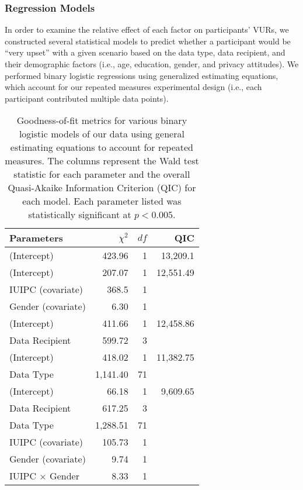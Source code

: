 
\subsubsection{Regression Models} 
\label{sec:regression}
In order to examine the relative effect of each factor on participants' VURs, we constructed several statistical models to predict whether a participant would be ``very upset'' with a given scenario based on the data type, data recipient, and their demographic factors (i.e., age, education, gender, and privacy attitudes). We performed binary logistic regressions using generalized estimating equations, which account for our repeated measures experimental design (i.e., each participant contributed multiple data points).

\begin{table}[t]
\centering
\begin{tabular}{|l| r| r| r|}
\hline
Parameters & $\chi^2$ & $df$ & QIC\\
\hline
\hline
(Intercept) & 423.96 & 1 & 13,209.1\\
\hline
(Intercept) & 207.07 & 1 & 12,551.49\\
IUIPC (covariate) & 368.5 & 1 & \\
Gender (covariate) & 6.30 & 1 & \\
\hline
(Intercept) & 411.66 & 1 &12,458.86\\
Data Recipient & 599.72 & 3 & \\
\hline
(Intercept) & 418.02 & 1 & 11,382.75\\
Data Type & 1,141.40 & 71 & \\
\hline
(Intercept) & 66.18 & 1 & 9,609.65 \\
Data Recipient & 617.25 & 3 & \\
Data Type & 1,288.51 & 71 & \\
IUIPC (covariate) & 105.73 & 1 & \\
Gender (covariate) & 9.74 & 1 & \\
IUIPC $\times$ Gender & 8.33 & 1 &\\
\hline
\end{tabular}
\caption{Goodness-of-fit metrics for various binary logistic models of our data using general estimating equations to account for repeated measures. The columns represent the Wald test statistic for each parameter and the overall Quasi-Akaike Information Criterion (QIC) for each model. Each parameter listed was statistically significant at $p<0.005$.}
\label{regression}
\end{table}

